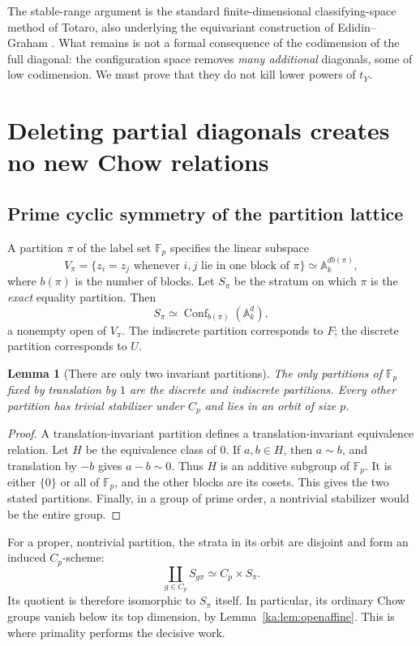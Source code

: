 \documentclass[11pt,a4paper]{article}
\newtheorem{lemma}[theorem]{Lemma}
\theoremstyle{definition}
\theoremstyle{remark}
\newcommand{\F}{\mathbb F}
\newcommand{\A}{\mathbb A}
\newcommand{\Conf}{\operatorname{Conf}}
\begin{document}
The stable-range argument is the standard finite-dimensional
classifying-space method of Totaro, also underlying the equivariant
construction of Edidin--Graham \cite{ka:Totaro,ka:EdidinGraham}. What remains
is not a formal consequence of the codimension of the full diagonal:
the configuration space removes \emph{many additional} diagonals, some
of low codimension. We must prove that they do not kill lower powers
of $t_Y$.

\section{Deleting partial diagonals creates no new Chow relations}
\label{ka:sec:deletion}

\subsection{Prime cyclic symmetry of the partition lattice}
A partition $\pi$ of the label set $\F_p$ specifies the linear subspace
\begin{equation}
 V_\pi=\{z_i=z_j\text{ whenever }i,j\text{ lie in one block of }\pi\}
       \simeq\A_k^{d b(\pi)},
 \label{ka:eq:partitionflat}
\end{equation}
where $b(\pi)$ is the number of blocks. Let $S_\pi$ be the stratum on
which $\pi$ is the \emph{exact} equality partition. Then
\[
 S_\pi\simeq\Conf_{b(\pi)}(\A_k^d),
\]
a nonempty open of $V_\pi$. The indiscrete partition corresponds to $F$;
the discrete partition corresponds to $U$.

\begin{lemma}[There are only two invariant partitions]
\label{ka:lem:partitions}
The only partitions of $\F_p$ fixed by translation by $1$ are the
discrete and indiscrete partitions. Every other partition has trivial
stabilizer under $C_p$ and lies in an orbit of size $p$.
\end{lemma}
\begin{proof}
A translation-invariant partition defines a translation-invariant
equivalence relation. Let $H$ be the equivalence class of $0$.
If $a,b\in H$, then $a\sim b$, and translation by $-b$ gives
$a-b\sim0$. Thus $H$ is an additive subgroup of $\F_p$. It is either
$\{0\}$ or all of $\F_p$, and the other blocks are its cosets. This
gives the two stated partitions. Finally, in a group of prime order,
a nontrivial stabilizer would be the entire group.
\end{proof}

For a proper, nontrivial partition, the strata in its orbit are disjoint
and form an induced $C_p$-scheme:
\begin{equation}
 \coprod_{g\in C_p}S_{g\pi}\simeq C_p\times S_\pi.
 \label{ka:eq:inducedstratum}
\end{equation}
Its quotient is therefore isomorphic to $S_\pi$ itself. In particular,
its ordinary Chow groups vanish below its top dimension, by
Lemma~\ref{ka:lem:openaffine}. This is where primality performs the decisive
work.
\end{document}
